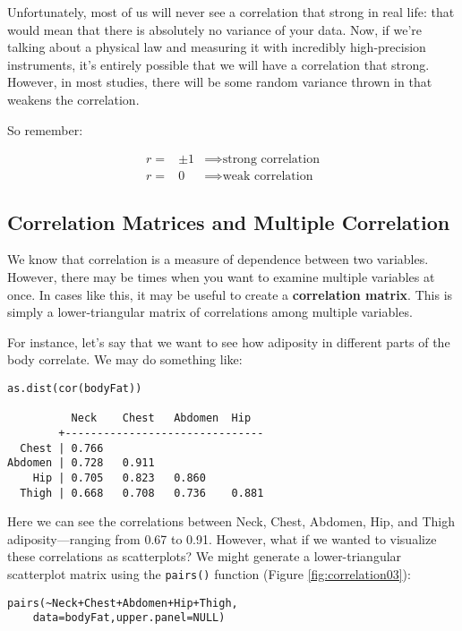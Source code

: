 Unfortunately, most of us will never see a correlation that strong in real life: that would mean that there is absolutely no variance of your data. Now, if we're talking about a physical law and measuring it with incredibly high-precision instruments, it's entirely possible that we will have a correlation that strong. However, in most studies, there will be some random variance thrown in that weakens the correlation.

So remember:

\begin{eqnarray*}
r=& \pm1 &\implies \text{strong correlation} \\
r=& 0 &\implies \text{weak correlation}
\end{eqnarray*}


\subsection{Correlation Matrices and Multiple Correlation}
We know that correlation is a measure of dependence between two variables. However, there may be times when you want to examine multiple variables at once. In cases like this, it may be useful to create a \textbf{correlation matrix}. This is simply a lower-triangular matrix of correlations among multiple variables.

For instance, let's say that we want to see how adiposity in different parts of the body correlate. We may do something like:

\begin{framed}
\begin{Verbatim}[samepage=TRUE]
as.dist(cor(bodyFat))

          Neck    Chest   Abdomen  Hip
        +-------------------------------
  Chest | 0.766 
Abdomen | 0.728   0.911
    Hip | 0.705   0.823   0.860  
  Thigh | 0.668   0.708   0.736    0.881
\end{Verbatim}
\end{framed}

Here we can see the correlations between Neck, Chest, Abdomen, Hip, and Thigh adiposity---ranging from 0.67 to 0.91. However, what if we wanted to visualize these correlations as scatterplots? We might generate a lower-triangular scatterplot matrix using the \verb|pairs()| function (Figure \ref{fig:correlation03}):

\begin{framed}
\begin{Verbatim}[samepage=TRUE]
pairs(~Neck+Chest+Abdomen+Hip+Thigh,
    data=bodyFat,upper.panel=NULL)
\end{Verbatim}
\end{framed}

